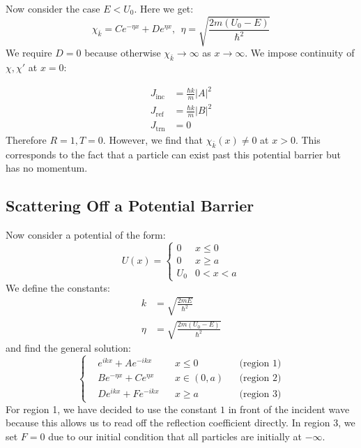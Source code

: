 \documentclass[../Main.tex]{subfiles}
\begin{document}
Now consider the case $E < U_0$. Here we get:
\begin{equation*}
    \chi_{\bar{k}} = Ce^{-\eta x} + De^{\eta x},~~\eta = \sqrt{\frac{2m(U_0 - E)}{\hbar^2}}
\end{equation*}
We require $D = 0$ because otherwise $\chi_{\bar{k}} \to \infty$ as $x \to \infty$. We impose continuity of $\chi, \chi'$ at $x = 0$: %

\begin{align*}
    J_\text{inc}&= \frac{\hbar k}{m}|A|^2 \\
    J_\text{ref}&= \frac{\hbar k}{m}|B|^2 \\
    J_\text{trn}&= 0
\end{align*}
Therefore $R = 1, T = 0$. However, we find that $\chi_{\bar{k}}(x) \neq 0$ at $x > 0$. This corresponds to the fact that a particle can exist past this potential barrier but has no momentum.
\subsection{Scattering Off a Potential Barrier}
Now consider a potential of the form:
\begin{equation*}
    U(x) =
    \begin{cases}
        0 & x \leq 0 \\
        0 & x \geq a \\
        U_0 & 0 < x < a
    \end{cases}
\end{equation*}
We define the constants:
\begin{align*}
    k &= \sqrt{\frac{2mE}{\hbar^2}} \\
    \eta &= \sqrt{\frac{2m(U_0 - E)}{\hbar^2}}
\end{align*}
and find the general solution:
\begin{equation*}
    \left\{\begin{aligned}
        &e^{ikx} + Ae^{-ikx} && x \leq 0 && \text{(region 1)} \\
        &Be^{-\eta x} + Ce^{\eta x} && x \in (0, a) && \text{(region 2)} \\
        &De^{ikx} + Fe^{-ikx} && x \geq a && \text{(region 3)}
    \end{aligned}\right.
\end{equation*}
For region 1, we have decided to use the constant $1$ in front of the incident wave because this allows us to read off the reflection coefficient directly.
In region 3, we set $F = 0$ due to our initial condition that all particles are initially at $-\infty$.
\end{document}
